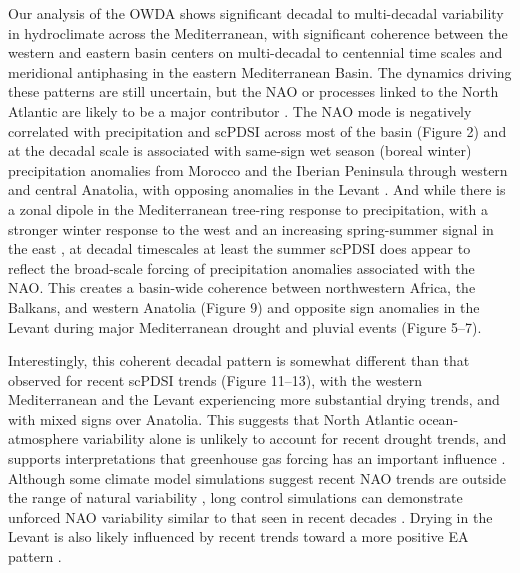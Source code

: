 \documentclass[draft,jgr]{AGUTeX}
\begin{document}
\begin{article}
\indent Our analysis of the OWDA shows significant decadal to multi-decadal variability in hydroclimate across the Mediterranean, with significant coherence between the western and eastern basin centers on multi-decadal to centennial time scales and meridional antiphasing in the eastern Mediterranean Basin. The dynamics driving these patterns are still uncertain, but the NAO or processes linked to the North Atlantic are likely to be a major contributor \citep{Hurrell:vanLoon1997,Eshel:Farrell2000}. The NAO mode is negatively correlated with precipitation and scPDSI across most of the basin (Figure 2) and at the decadal scale is associated with same-sign wet season (boreal winter) precipitation anomalies from Morocco and the Iberian Peninsula through western and central Anatolia, with opposing anomalies in the Levant \citep{Mariotti:etal2002,Xoplaki:etal2004}. And while there is a zonal dipole in the Mediterranean tree-ring response to precipitation, with a stronger winter response to the west and an increasing spring-summer signal in the east \citep{Touchan:etal2014a,Touchan:etal2014b}, at decadal timescales at least the summer scPDSI does appear to reflect the broad-scale forcing of precipitation anomalies associated with the NAO. This creates a basin-wide coherence between northwestern Africa, the Balkans, and western Anatolia (Figure 9) and opposite sign anomalies in the Levant during major Mediterranean drought and pluvial events (Figure 5--7).  

\indent Interestingly, this coherent decadal pattern is somewhat different than that observed for recent scPDSI trends (Figure 11--13), with the western Mediterranean and the Levant experiencing more substantial drying trends, and with mixed signs over Anatolia.  This suggests that North Atlantic ocean-atmosphere variability alone is unlikely to account for recent drought trends, and supports interpretations that greenhouse gas forcing has an important influence \citep{Kelley2012,Seager2014med,Kelley2015}.  Although some climate model simulations suggest recent NAO trends are outside the range of natural variability \citep{Osborn:2004,Kuzmina:etal2005}, long control simulations can demonstrate unforced NAO variability similar to that seen in recent decades \citep{Semenov:etal2008}. Drying in the Levant is also likely influenced by recent trends toward a more positive EA pattern \citep{Krichak:etal2002,Krichak:etal2005,Lim:2014}.


\end{article}
\end{document}
